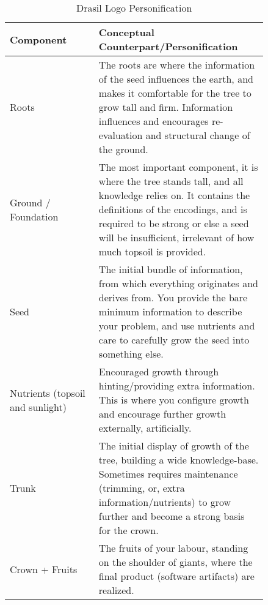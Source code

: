 \begin{longtable}[c]{|>{\raggedright}p{0.3\linewidth}|>{\raggedright\arraybackslash}p{0.54\linewidth}|}
    \caption{Drasil Logo Personification}
    \label{tab:drasilPersonification}
    \\

    \hline

    \rowcolor{McMasterMediumGrey}
    \textbf{Component}                 & \textbf{Conceptual Counterpart/Personification}

    \\ \hline

    {Roots}                            & {The roots are where the information of
            the seed influences the earth, and makes it comfortable for the tree
            to grow tall and firm. Information influences and encourages
            re-evaluation and structural change of the ground.}

    \\ \hline

    {Ground / Foundation}              & {The most important component, it is
            where the tree stands tall, and all knowledge relies on. It contains
            the definitions of the encodings, and is required to be strong or
            else a seed will be insufficient, irrelevant of how much topsoil is
            provided.}

    \\ \hline

    {Seed}                             & {The initial bundle of information,
            from which everything originates and derives from. You provide the
            bare minimum information to describe your problem, and use nutrients
            and care to carefully grow the seed into something else.}

    \\ \hline

    {Nutrients (topsoil and sunlight)} & {Encouraged growth through
            hinting/providing extra information. This is where you configure
            growth and encourage further growth externally, artificially.}

    \\ \hline

    {Trunk}                            & {The initial display of growth of the
            tree, building a wide knowledge-base. Sometimes requires maintenance
            (trimming, or, extra information/nutrients) to grow further and
            become a strong basis for the crown.}

    \\ \hline

    {Crown + Fruits}                   & {The fruits of your labour, standing on
            the shoulder of giants, where the final product (software artifacts)
            are realized.}

    \\ \hline
\end{longtable}
